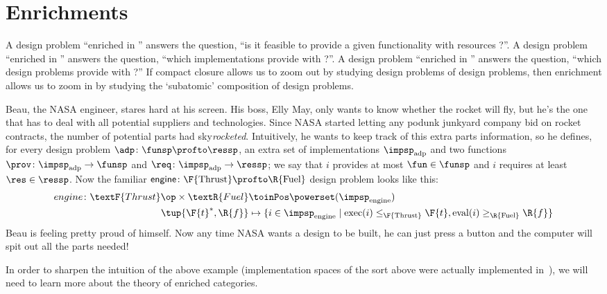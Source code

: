  \section{Enrichments}
\label{sec:enriched}
A design problem ``enriched in \Bool'' answers the question, ``is it feasible to provide a given functionality \fun with resources \res?''. A design problem ``enriched in \Set'' answers the question, ``which implementations provide \fun with \res?''. A design problem ``enriched in \DP'' answers the question, ``which design problems provide \fun with \res?'' If compact closure allows us to zoom out by studying design problems of design problems, then enrichment allows us to zoom in by studying the `subatomic' composition of design problems.

\begin{example}
  \label{ex:dpi_example}
  Beau, the NASA engineer, stares hard at his screen. His boss, Elly May, only wants to know whether the rocket will fly, but he's the one that has to deal with all potential suppliers and technologies. Since NASA started letting any podunk junkyard company bid on rocket contracts, the number of potential parts had sky\emph{rocketed}. Intuitively, he wants to keep track of this extra parts information, so he defines, for every design problem $\adp \colon \funsp \profto \ressp$, an extra set of implementations $\impsp_\text{adp}$ and two functions $\prov\colon \impsp_\text{adp} \to \funsp$ and  $\req\colon \impsp_\text{adp} \to \ressp$; we say that $i$ provides at most $\fun \in \funsp$ and $i$ requires at least $\res \in \ressp$. Now the familiar $\mathsf{engine} \colon \F{\text{Thrust}} \profto \R{\text{Fuel}}$ design problem looks like this:
  \begin{equation*}
    \begin{aligned}
      engine \colon \textF{Thrust}\op \times \textR{Fuel} &\toinPos \powerset(\impsp_\text{engine}) \\
      \tup{\F{t}^*,\R{f}} &\mapsto \{ i \in \impsp_\text{engine} \mid \text{exec}(i) \leq_\F{\text{Thrust}} \F{t}, \text{eval}(i) \geq_\R{\text{Fuel}} \R{f} \}
    \end{aligned}
  \end{equation*}
  Beau is feeling pretty proud of himself. Now any time NASA wants a design to be built, he can just press a button and the computer will spit out all the parts needed!
\end{example}

In order to sharpen the intuition of the above example (implementation spaces of the sort above were actually implemented in~\cite{censi}), we will need to learn more about the theory of enriched categories.

